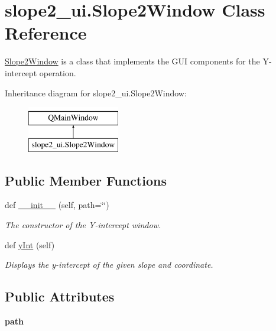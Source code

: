 \hypertarget{classslope2__ui_1_1_slope2_window}{}\section{slope2\+\_\+ui.\+Slope2\+Window Class Reference}
\label{classslope2__ui_1_1_slope2_window}


\hyperlink{classslope2__ui_1_1_slope2_window}{Slope2\+Window} is a class that implements the G\+UI components for the Y-\/intercept operation.  


Inheritance diagram for slope2\+\_\+ui.\+Slope2\+Window\+:\begin{figure}[H]
\begin{center}
\leavevmode
\includegraphics[height=2.000000cm]{classslope2__ui_1_1_slope2_window}
\end{center}
\end{figure}
\subsection*{Public Member Functions}
\begin{DoxyCompactItemize}
\item 
def \hyperlink{classslope2__ui_1_1_slope2_window_a99585670c54dbd059dea1c94f702dee5}{\+\_\+\+\_\+init\+\_\+\+\_\+} (self, path=\char`\"{}\char`\"{})
\begin{DoxyCompactList}\small\item\em The constructor of the Y-\/intercept window. \end{DoxyCompactList}\item 
def \hyperlink{classslope2__ui_1_1_slope2_window_a9aeddb429bd96a1fff389d2284195a4a}{y\+Int} (self)
\begin{DoxyCompactList}\small\item\em Displays the y-\/intercept of the given slope and coordinate. \end{DoxyCompactList}\end{DoxyCompactItemize}
\subsection*{Public Attributes}
\begin{DoxyCompactItemize}
\item 
\mbox{\label{classslope2__ui_1_1_slope2_window_a95edf54d35b0ce893e01056ccd6a75a3}} 
{\bfseries path}
\end{DoxyCompactItemize}


